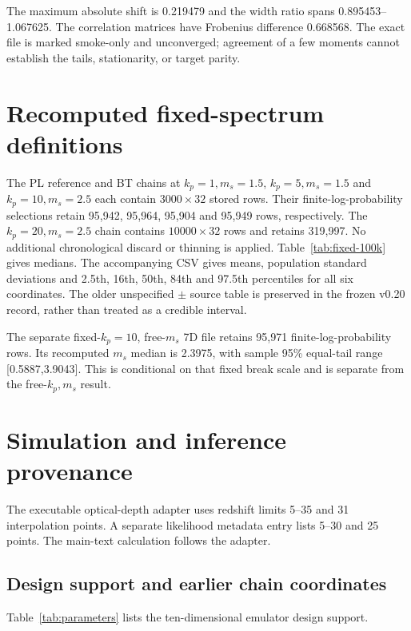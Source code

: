 The maximum absolute shift is 0.219479 and the width ratio spans 0.895453--1.067625. The correlation matrices have Frobenius difference 0.668568. The exact file is marked smoke-only and unconverged; agreement of a few moments cannot establish the tails, stationarity, or target parity.

\section{Recomputed fixed-spectrum definitions}\label{app:recomputed-fixed}

The PL reference and BT chains at $k_p=1,m_s=1.5$, $k_p=5,m_s=1.5$ and $k_p=10,m_s=2.5$ each contain $3000\times32$ stored rows. Their finite-log-probability selections retain 95,942, 95,964, 95,904 and 95,949 rows, respectively. The $k_p=20,m_s=2.5$ chain contains $10000\times32$ rows and retains 319,997. No additional chronological discard or thinning is applied. Table~\ref{tab:fixed-100k} gives medians. The accompanying CSV gives means, population standard deviations and 2.5th, 16th, 50th, 84th and 97.5th percentiles for all six coordinates. The older unspecified $\pm$ source table is preserved in the frozen v0.20 record, rather than treated as a credible interval.

The separate fixed-$k_p=10$, free-$m_s$ 7D file retains 95,971 finite-log-probability rows. Its recomputed $m_s$ median is 2.3975, with sample 95\% equal-tail range [0.5887,3.9043]. This is conditional on that fixed break scale and is separate from the free-$k_p,m_s$ result.

\section{Simulation and inference provenance}\label{app:provenance}

The executable optical-depth adapter uses redshift limits 5--35 and 31 interpolation points. A separate likelihood metadata entry lists 5--30 and 25 points. The main-text calculation follows the adapter.


\subsection{Design support and earlier chain coordinates}\label{parameter-domain-and-chain-definitions}

Table~\ref{tab:parameters} lists the ten-dimensional emulator design support.

